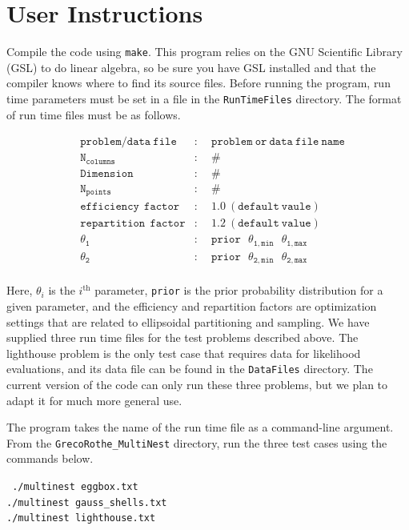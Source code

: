 \documentclass{article}
\def\mtt{\mathtt}
\def\mrm{\mathrm}
\begin{document}
\section{User Instructions}
Compile the code using {\tt make}.  This program relies on the GNU Scientific Library (GSL) to do linear algebra, so be sure  you have GSL installed and that the compiler knows where to find its source files. Before running the program, run time parameters must be set in a file in the {\tt RunTimeFiles} directory. The format of run time files must be as follows. 

\begin{align*}
&\mtt{problem/data \ file}    &:& \ \ \mtt{problem \ or \ data \ file \ name}\\
&\mtt{N_{columns}}  	     &:& \ \ \mtt{\#}\\       
&\mtt{Dimension} 	            &:& \ \ \mtt{\# }\\
&\mtt{N_{points}}                &:& \ \ \mtt{\#}\\
&\mtt{efficiency \  \ factor}   &:& \ \ \mtt{1.0 \ (default \ vaule)}\\  
&\mtt{repartition \  \ factor}  &:& \ \ \mtt{1.2 \ (default \ value)}\\
&\mtt{\theta_1}                    &:& \ \ \mtt{prior \  \ \  \theta_{1,min}  \  \ \ \theta_{1,max}}\\     
&\mtt{\theta_2}                    &:& \ \ \mtt{prior \  \  \ \theta_{2,min}  \  \ \  \theta_{2,max}}\\     
\end{align*}

\noindent Here, $\theta_i$ is the $i^\mrm{th}$ parameter, {\tt prior} is the prior probability distribution for a given parameter, and the efficiency and repartition factors are optimization settings that are related to ellipsoidal partitioning and sampling. We have supplied three run time files for the test problems described above. The lighthouse problem is the only test case that requires data for likelihood evaluations, and its data file can be found in the {\tt DataFiles} directory. The current version of the code can only run these three problems, but we plan to adapt it for much more general use. 

The program takes the name of the run time file as a command-line argument. From the {\tt GrecoRothe\_MultiNest} directory, run the three test cases using the commands below.

\begin{adjustwidth*}{5cm}{3.5cm}
 {\tt 
 ./multinest eggbox.txt\\
./multinest gauss\_shells.txt\\
 ./multinest lighthouse.txt\\
 }
 \end{adjustwidth*}
 
\end{document}
